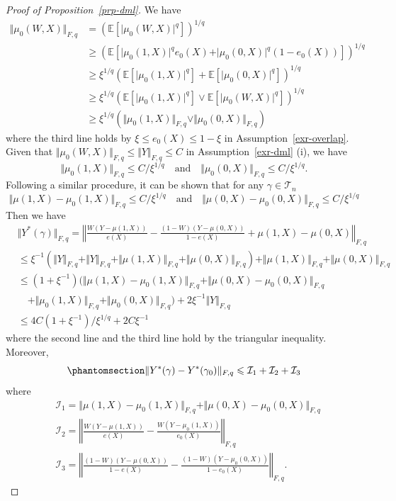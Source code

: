 \documentclass[
  12pt,
  12pt]{article}
\numberwithin{equation}{section}
\theoremstyle{definition}
\theoremstyle{plain}
\theoremstyle{plain}
\theoremstyle{remark}
\begin{document}
\begin{proof}[Proof of Proposition~\ref{prp-dml}]
We have \[
\begin{aligned}
\Vert \mu_0(W, X) \Vert_{F, q} &= (\mathbb{E}[\vert \mu_0(W, X) \vert^q])^{1/q} \\
&\geqslant (\mathbb{E}[\vert \mu_0(1, X) \vert^q e_0(X) + \vert \mu_0(0, X) \vert^q (1 - e_0(X))])^{1/q} \\
&\geqslant \xi^{1/q}(\mathbb{E}[\vert \mu_0(1, X) \vert^q] + \mathbb{E}[\vert \mu_0(0, X) \vert^q])^{1/q} \\
&\geqslant \xi^{1/q}(\mathbb{E}[\vert \mu_0(1, X) \vert^q] \vee \mathbb{E}[\vert \mu_0(W, X) \vert^q])^{1/q} \\
&\geqslant \xi^{1/q}(\Vert \mu_0(1, X) \Vert_{F, q} \vee \Vert \mu_0(0, X) \Vert_{F, q})
\end{aligned}
\] where the third line holds by
\(\xi \leqslant e_0(X) \leqslant 1 - \xi\) in
Assumption~\ref{exr-overlap}. Given that
\(\Vert \mu_0(W, X) \Vert_{F, q} \leqslant \Vert Y \Vert_{F, q} \leqslant C\)
in Assumption~\ref{exr-dml} (i), we have \[
\Vert \mu_0(1, X) \Vert_{F, q} \leqslant C/\xi^{1/q} \quad \text{and} \quad \Vert \mu_0(0, X) \Vert_{F, q} \leqslant C/\xi^{1/q}.
\] Following a similar procedure, it can be shown that for any
\(\gamma \in \mathcal{T}_n\) \[
\Vert \mu(1, X) - \mu_0(1, X) \Vert_{F, q} \leqslant C/\xi^{1/q} \quad \text{and} \quad \Vert \mu(0, X) - \mu_0(0, X) \Vert_{F, q} \leqslant C/\xi^{1/q}
\] Then we have \[
\begin{aligned}
&\Vert Y^*(\gamma) \Vert_{F, q} = \left\Vert \frac{W(Y - \mu(1, X))}{e(X)} - \frac{(1 - W)(Y - \mu(0, X))}{1 - e(X)} + \mu(1, X) - \mu(0, X) \right\Vert_{F, q} \\
&\leqslant \xi^{-1}(\Vert Y \Vert_{F, q} + \Vert Y \Vert_{F, q} + \Vert \mu(1, X) \Vert_{F, q} + \Vert \mu(0, X) \Vert_{F, q}) + \Vert \mu(1, X) \Vert_{F, q} + \Vert \mu(0, X) \Vert_{F, q} \\
&\leqslant (1 + \xi^{-1})(\Vert \mu(1, X) - \mu_0(1, X) \Vert_{F, q} + \Vert \mu(0, X) - \mu_0(0, X) \Vert_{F, q} \\
&\quad + \Vert \mu_0(1, X) \Vert_{F, q} + \Vert \mu_0(0, X) \Vert_{F, q}) + 2\xi^{-1}\Vert Y \Vert_{F, q} \\
&\leqslant 4C(1 + \xi^{-1}) / \xi^{1/q} + 2C\xi^{-1}
\end{aligned}
\] where the second line and the third line hold by the triangular
inequality. Moreover, \begin{equation}\phantomsection\label{eq-yerror}{
\Vert Y^*(\gamma) - Y^*(\gamma_0) \Vert_{F, q} \leqslant \mathcal{I}_1 + \mathcal{I}_2 + \mathcal{I}_3
}\end{equation} where \[
\begin{aligned}
&\mathcal{I}_1 = \Vert \mu(1, X) - \mu_0(1, X) \Vert_{F, q} + \Vert \mu(0, X) - \mu_0(0, X) \Vert_{F, q} \\
&\mathcal{I}_2 = \left\Vert \frac{W(Y - \mu(1, X))}{e(X)} - \frac{W(Y - \mu_0(1, X))}{e_0(X)} \right\Vert_{F, q} \\
&\mathcal{I}_3 = \left\Vert \frac{(1 - W)(Y - \mu(0, X))}{1 - e(X)} - \frac{(1 - W)(Y - \mu_0(0, X))}{1 - e_0(X)} \right\Vert_{F, q}.
\end{aligned}
\]


\end{proof}
\end{document}
